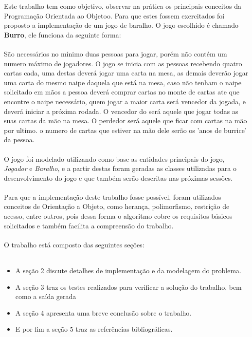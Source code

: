 \documentclass[12pt, a4paper]{article}
\begin{document}
  Este trabalho tem como objetivo, observar na prática os principais conceitos da Programação Orientada ao Objetoo. Para que estes fossem exercitados foi proposto a implementação de um jogo de baralho. O jogo escolhido é chamado \textbf{Burro}, ele funciona da seguinte forma:
  \\\\
  São necessários no mínimo duas pessoas para jogar, porém não contém um numero máximo de jogadores. O jogo se inicia com as pessoas recebendo quatro cartas cada, uma destas deverá jogar uma carta na mesa, as demais deverão jogar uma carta do mesmo naipe daquela que está na mesa, caso não tenham o naipe solicitado em mãos a pessoa deverá comprar cartas no monte de cartas ate que encontre o naipe necessário, quem jogar a maior carta será  vencedor da jogada, e deverá iniciar a próxima rodada. O vencedor do será aquele que jogar todas as suas cartas da mão na mesa. O perdedor será aquele que ficar com cartas na mão por ultimo. o numero de cartas que estiver na mão dele serão os 'anos de burrice' da pessoa.
  \\\\
  O jogo foi modelado utilizando como base as entidades principais do jogo, \textit{Jogador} e \textit{Baralho}, e a partir destas foram geradas as classes utilizadas para o desenvolvimento do jogo e que também serão descritas nas próximas sessões.
  \\\\
  Para que a implementação deste trabalho fosse possível, foram utilizados conceitos de Orientação a Objeto, como herança, polimorfismo, restrição de acesso, entre outros, pois dessa forma o algoritmo cobre os requisitos básicos solicitados e também facilita a compreensão do trabalho.
  \\\\
  O trabalho está composto das seguintes seções:\\\\
  \begin{itemize}
    \item A seção 2 discute detalhes de implementação e da modelagem do problema.
    \item A seção 3 traz os testes realizados para verificar a solução do trabalho, bem como a saída gerada
    \item A seção 4 apresenta uma breve conclusão sobre o trabalho.
    \item E por fim a seção 5 traz as referências bibliográficas.
  \end{itemize}
\end{document}
